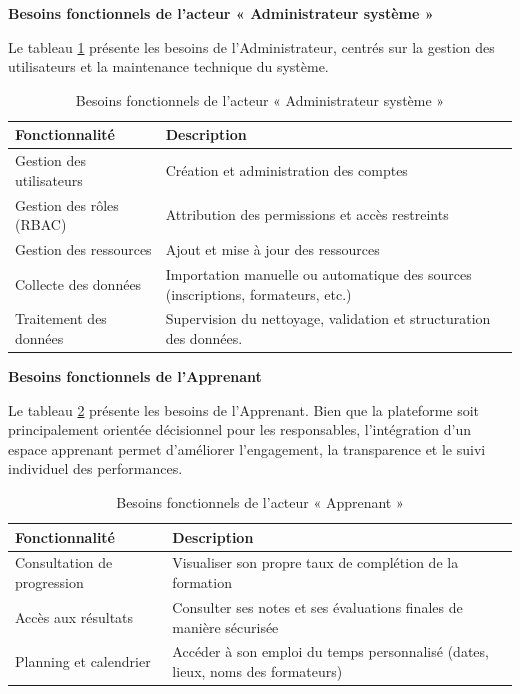 \noindent \textbf{Besoins fonctionnels de l’acteur « Administrateur système »}

\noindent Le tableau \ref{tab:Besoins fonctionnels de l’acteur « Administrateur »} présente les besoins de l’Administrateur, centrés sur la gestion des utilisateurs et la maintenance technique du système. 
\begin{table}[H]
\centering
\caption{Besoins fonctionnels de l’acteur « Administrateur système  »}
\label{tab:Besoins fonctionnels de l’acteur « Administrateur »}
\begin{tabular}{|p{4.5cm}| p{11cm}|}
\hline
\textbf{Fonctionnalité} & \textbf{Description} \\
\hline
Gestion des utilisateurs & Création et administration des comptes \\
\hline
Gestion des rôles (RBAC) & Attribution des permissions et accès restreints\\
\hline
Gestion des ressources  & Ajout et mise à jour des ressources\\
\hline
 Collecte des données  & Importation manuelle ou automatique des sources (inscriptions, formateurs, etc.)\\
\hline
Traitement des données  & Supervision du nettoyage, validation et structuration des données.\\
\hline
\end{tabular}
\end{table}


\noindent\textbf{Besoins fonctionnels de l'Apprenant}

\vspace{0.3cm}


\noindent Le tableau \ref{tab:Besoins fonctionnels de l’acteur « Apprenant »} présente les besoins de l’Apprenant. Bien que la plateforme soit principalement orientée décisionnel pour les responsables, l’intégration d’un espace apprenant permet d’améliorer l’engagement, la transparence et le suivi individuel des performances.

\begin{table}[H]
\centering
\caption{Besoins fonctionnels de l’acteur « Apprenant »}
\label{tab:Besoins fonctionnels de l’acteur « Apprenant »}
\begin{tabular}{|p{4.5cm}| p{11cm}|}
\hline
\textbf{Fonctionnalité} & \textbf{Description} \\
\hline
 Consultation de progression& Visualiser son propre taux de complétion de la formation \\
\hline
Accès aux résultats  & Consulter ses notes et ses évaluations finales de manière sécurisée\\
\hline
  Planning et calendrier & Accéder à son emploi du temps personnalisé (dates, lieux, noms des formateurs)\\
\hline
\end{tabular}
\end{table}




